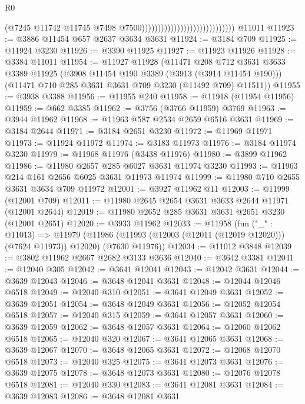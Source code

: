 \begin{lexlean}{R0}
\begin{coremodule}
                                                            (@7245
                                                              @11742
                                                              @11745
                                                              @7498
                                                              @7500)))))))))))))))))))))))))))))
    @11011
@11923 := @3886 @11454 @657 @2637 @3634 @3631
@11924 := @3184 @709
@11925 := @11924 @3230
@11926 := @3390 @11925
@11927 := @11923 @11926
@11928 := @3384 @11011
@11954 := @11927
    @11928
    (@11471
      @208
      @712
      @3631
      @3633
      @3389
      @11925
      (@3908 @11454 @190 @3389 (@3913 (@3914 @11454 @190)))
      (@11471 @710 @285 @3631 @3631 @709 @3230 (@11492 @709) @11511))
@11955 := @3938 @3388
@11956 := @11955 @240
@11958 := @11918 (@11954 @11956)
@11959 := @662 @3385
@11962 := @3756 (@3766 @11959) @3769
@11963 := @3944 @11962
@11968 := @11963 @587 @2534 @2659 @6516 @3631
@11969 := @3184 @2644
@11971 := @3184 @2651 @3230
@11972 := @11969 @11971
@11973 := @11924 @11972
@11974 := @3183 @11973
@11976 := @3184 @11974 @3230
@11979 := @11968 @11976 (@3438 @11976)
@11980 := @3899 @11962
@11986 := @11980 @2657 @285 @6027 @3631 @11974 @3230
@11993 := @11963 @214 @161 @2656 @6025 @3631 @11973 @11974
@11999 := @11980 @710 @2655 @3631 @3634 @709 @11972
@12001 := @3927 @11962 @11
@12003 := @11999 (@12001 @709)
@12011 := @11980 @2645 @2654 @3631 @3633 @2644 @11971 (@12001 @2644)
@12019 := @11980 @2652 @285 @3631 @3631 @2651 @3230 (@12001 @2651)
@12020 := @3933 @11962
@12033 := @11958
    (fun ("_" : @11013) =>
    @11979 (@11986 (@11993 (@12003 (@12011 (@12019 @12020))) (@7624 @11973)) @12020) (@7630 @11976))
@12034 := @11012 @3848
@12039 := @3802 @11962 @2667 @2682 @3133 @3636
@12040 := @3642 @3381
@12041 := @12040 @305
@12042 := @3641 @12041
@12043 := @12042 @3631
@12044 := @3639 @12043
@12046 := @3648 @12041 @3631
@12048 := @12044 @12046 @6518
@12049 := @12040 @310
@12051 := @3641 @12049 @3631
@12052 := @3639 @12051
@12054 := @3648 @12049 @3631
@12056 := @12052 @12054 @6518
@12057 := @12040 @315
@12059 := @3641 @12057 @3631
@12060 := @3639 @12059
@12062 := @3648 @12057 @3631
@12064 := @12060 @12062 @6518
@12065 := @12040 @320
@12067 := @3641 @12065 @3631
@12068 := @3639 @12067
@12070 := @3648 @12065 @3631
@12072 := @12068 @12070 @6518
@12073 := @12040 @325
@12075 := @3641 @12073 @3631
@12076 := @3639 @12075
@12078 := @3648 @12073 @3631
@12080 := @12076 @12078 @6518
@12081 := @12040 @330
@12083 := @3641 @12081 @3631
@12084 := @3639 @12083
@12086 := @3648 @12081 @3631

\end{coremodule}
\end{lexlean}
